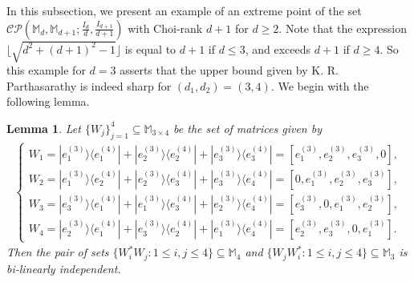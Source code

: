 \documentclass[10pt,reqno]{amsart}
\theoremstyle{definition}
\theoremstyle{plain}
\newtheorem{lem}[defn]{Lemma}
\theoremstyle{remark}
\newcommand{\mbb}[1]{\mathbb{#1}}
\newcommand{\msc}[1]{\mathscr{#1}}
\newcommand{\M}[1]{\mbb{M}_{#1}}%
\newcommand{\ranko}[2]{|{#1}\rangle\langle{#2}|}
\numberwithin{equation}{section}%
\begin{document}
In this subsection, we present an example of an extreme point of the set $\msc{CP}(\M{d}, \M{d+1}; \frac{I_d}{d}, \frac{I_{d+1}}{d+1})$ with Choi-rank $d+1$ for $d\geq 2$. Note that the expression $\lfloor{\sqrt{d^2+(d+1)^2-1}}\rfloor$ is equal to $d+1$ if $d\leq 3$, and exceeds $d+1$ if $d\geq 4$. So this example for $d=3$ asserts that the upper bound given by K. R. Parthasarathy is indeed sharp for $(d_1, d_2)=(3,4)$. We begin with the following lemma.






\begin{lem}\label{lem-CR-4 in 3 to 4}
	Let $\{W_j\}_{j=1}^4\subseteq\M{3\times 4}$ be the set of matrices given by
	\begin{align}\label{eq-CR-4 in 3 to 4}
			\begin{cases}
				W_1=\ranko{e_1^{(3)}}{e_1^{(4)}}+\ranko{e_2^{(3)}}{e_2^{(4)}}+\ranko{e_3^{(3)}}{e_3^{(4)}}=[e_1^{(3)},e_2^{(3)},e_3^{(3)},0],\\
				W_2=\ranko{e_1^{(3)}}{e_2^{(4)}}+\ranko{e_2^{(3)}}{e_3^{(4)}}+\ranko{e_3^{(3)}}{e_4^{(4)}}=[0,e_1^{(3)},e_2^{(3)},e_3^{(3)}],\\
				W_3=\ranko{e_3^{(3)}}{e_1^{(4)}}+\ranko{e_1^{(3)}}{e_3^{(4)}}+\ranko{e_2^{(3)}}{e_4^{(4)}}=[e_3^{(3)},0,e_1^{(3)},e_2^{(3)}],\\
				W_4=\ranko{e_2^{(3)}}{e_1^{(4)}}+\ranko{e_3^{(3)}}{e_2^{(4)}}+\ranko{e_1^{(3)}}{e_4^{(4)}}=[e_2^{(3)},e_3^{(3)},0,e_1^{(3)}].
			\end{cases}
    \end{align}
	Then the pair of sets $\{W_i^*W_j:1\leq i,j\leq 4\}\subseteq\M{4}$ and $\{W_jW_i^*:1\leq i,j\leq 4\}\subseteq\M{3}$ is bi-linearly independent.
\end{lem}
\end{document}
